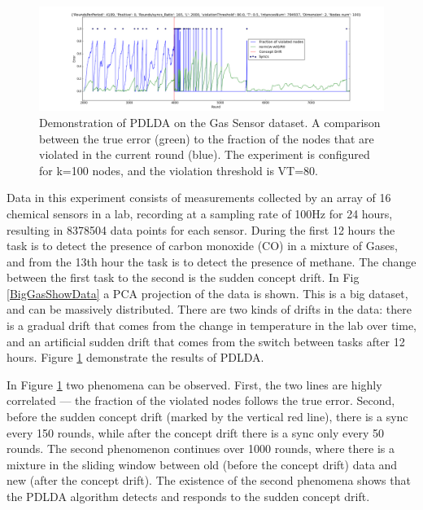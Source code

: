 \documentclass[11pt,twocolumn,varwidth=true,a4paper,fleqn]{article}
\begin{document}
\begin{figure}[ht!]
\centering
\includegraphics[width=\textwidth]{BigGas/overTime100k.png}
\caption{Demonstration of PDLDA on the Gas Sensor dataset. 
A comparison between the true error (green) to the fraction of the nodes that 
are violated in the current round (blue). 
The experiment is configured for k=100 nodes, and the violation threshold is
VT=80.}
\label{BigGasOverTime}
\end{figure}
Data in this experiment \cite{bigGas} consists of measurements collected
by an array of 16 chemical sensors in a lab, recording at a sampling
rate of 100Hz for 24 hours, resulting in 8378504 data points for each sensor. 
During the first 12 hours the task is to detect the presence of carbon monoxide
(CO) in a mixture of Gases, and from the 13th hour the task is to detect the presence of methane. 
The change between the first task to the second is the sudden concept drift.
In Fig \ref{BigGasShowData} a PCA projection of the data is shown.
This is a big dataset, and can be massively distributed. 
There are two kinds of drifts in the data: there is a gradual drift that comes from 
the change in temperature in the lab over time, and an
artificial sudden drift that comes from the switch between tasks after 12 hours.
Figure \ref{BigGasOverTime} demonstrate the results of PDLDA.

In Figure \ref{BigGasOverTime} two phenomena can be observed.
First, the two lines are highly correlated --- the fraction of the violated
nodes follows the true error. Second,  before the sudden concept drift 
(marked by the vertical red line), there is a sync every 150 rounds, while 
after the concept drift there is a sync only every 50 rounds.
The second phenomenon continues over 1000 rounds, where there is a mixture in the 
sliding window between old (before the concept drift) data and new 
(after the concept drift). The existence of the second phenomena shows that
the PDLDA algorithm detects and responds to the sudden concept drift.
\end{document}
